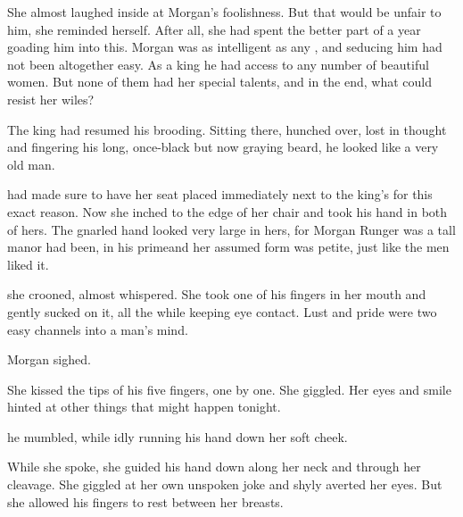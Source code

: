 She almost laughed inside at Morgan's foolishness. 
But that would be unfair to him, she reminded herself. 
After all, she had spent the better part of a year goading him into this. 
Morgan was as intelligent as any \human, and seducing him had not been altogether easy. 
As a king he had access to any number of beautiful women. 
But none of them had her special talents, and in the end, what \human{} could resist her wiles?

The king had resumed his brooding. 
Sitting there, hunched over, lost in thought and fingering his long, once-black but now graying beard, he looked like a very old man. 


\Takestsha{} had made sure to have her seat placed immediately next to the king's for this exact reason. 
Now she inched to the edge of her chair and took his hand in both of hers. 
The gnarled hand looked very large in hers, for Morgan Runger was a tall man\dash or had been, in his prime\dash and her assumed form was petite, just like the men liked it. 

 she crooned, almost whispered. 
She took one of his fingers in her mouth and gently sucked on it, all the while keeping eye contact. 
Lust and pride were two easy channels into a man's mind. 

Morgan sighed. 

She kissed the tips of his five fingers, one by one. 
She giggled. 
Her eyes and smile hinted at other things that might happen  tonight. 

 he mumbled, while idly running his hand down her soft cheek. 

While she spoke, she guided his hand down along her neck and through her cleavage. 
She giggled at her own unspoken joke and shyly averted her eyes. 
But she allowed his fingers to rest between her breasts. 

